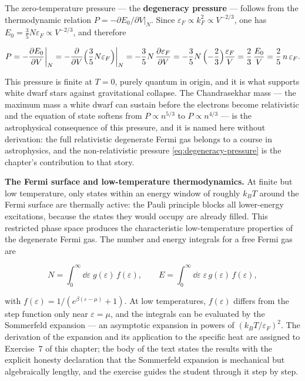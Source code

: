 The zero-temperature pressure --- the \textbf{degeneracy pressure} --- follows from the thermodynamic relation $P = -\partial E_0/\partial V|_N$. Since $\varepsilon_F \propto k_F^2 \propto V^{-2/3}$, one has $E_0 = \frac{3}{5}N\varepsilon_F \propto V^{-2/3}$, and therefore
\begin{linenomath}
    \begin{equation}
        P = -\frac{\partial E_0}{\partial V}\bigg|_N
          = -\frac{\partial}{\partial V}\Bigl(\frac{3}{5}N\varepsilon_F\Bigr)\bigg|_N
          = -\frac{3}{5}N\,\frac{\partial\varepsilon_F}{\partial V}
          = -\frac{3}{5}N\,\Bigl(-\frac{2}{3}\Bigr)\frac{\varepsilon_F}{V}
          = \frac{2}{3}\,\frac{E_0}{V}
          = \frac{2}{5}\,n\,\varepsilon_F.
        \label{eq:degeneracy-pressure}
    \end{equation}
\end{linenomath}
This pressure is finite at $T = 0$, purely quantum in origin, and it is what supports white dwarf stars against gravitational collapse. The Chandrasekhar mass --- the maximum mass a white dwarf can sustain before the electrons become relativistic and the equation of state softens from $P \propto n^{5/3}$ to $P \propto n^{4/3}$ --- is the astrophysical consequence of this pressure, and it is named here without derivation: the full relativistic degenerate Fermi gas belongs to a course in astrophysics, and the non-relativistic pressure \eqref{eq:degeneracy-pressure} is the chapter's contribution to that story.

\medskip\noindent\textbf{The Fermi surface and low-temperature thermodynamics.}
At finite but low temperature, only states within an energy window of roughly $k_B T$ around the Fermi surface are thermally active: the Pauli principle blocks all lower-energy excitations, because the states they would occupy are already filled. This restricted phase space produces the characteristic low-temperature properties of the degenerate Fermi gas. The number and energy integrals for a free Fermi gas are
\begin{linenomath}
    \begin{equation*}
        N = \int_0^\infty\!\dd\varepsilon\;g(\varepsilon)\,f(\varepsilon),
        \qquad
        E = \int_0^\infty\!\dd\varepsilon\;\varepsilon\,g(\varepsilon)\,f(\varepsilon),
    \end{equation*}
\end{linenomath}
with $f(\varepsilon) = 1/(e^{\beta(\varepsilon-\mu)} + 1)$. At low temperatures, $f(\varepsilon)$ differs from the step function only near $\varepsilon = \mu$, and the integrals can be evaluated by the Sommerfeld expansion --- an asymptotic expansion in powers of $(k_B T/\varepsilon_F)^2$. The derivation of the expansion and its application to the specific heat are assigned to Exercise~7 of this chapter; the body of the text states the results with the explicit honesty declaration that the Sommerfeld expansion is mechanical but algebraically lengthy, and the exercise guides the student through it step by step.

